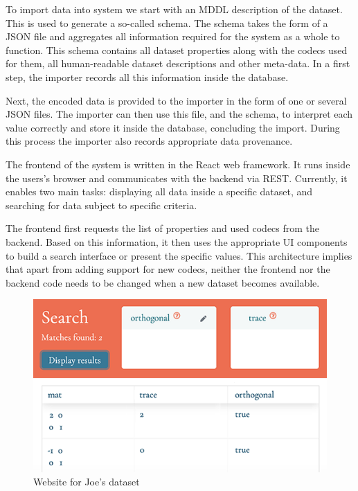 To import data into system we start with an MDDL description of the dataset. 
This is used to generate a so-called schema. 
The schema takes the form of a JSON file and aggregates all information required for the system as a whole to function. 
This schema contains all dataset properties along with the codecs used for them, all human-readable dataset descriptions and other meta-data. 
In a first step, the importer records all this information inside the database. 

Next, the encoded data is provided to the importer in the form of one or several JSON files. 
The importer can then use this file, and the schema, to interpret each value correctly and store it inside the database, concluding the import. 
During this process the importer also records appropriate data provenance. 

The frontend of the system is written in the React web framework.
It runs inside the users's browser and communicates with the backend via REST. 
Currently, it enables two main tasks: displaying all data inside a specific dataset, 
and searching for data subject to specific criteria. 

The frontend first requests the list of properties and used codecs from the backend. 
Based on this information, it then uses the appropriate UI components to build a search interface or present the specific values. 
This architecture implies that apart from adding support for new codecs, neither the frontend nor the backend code needs to be changed when a new dataset becomes available. 

\begin{figure}[ht]
  \includegraphics{data_joe.png}
  \caption{Website for Joe's dataset}\label{fig:joe}
\end{figure}

